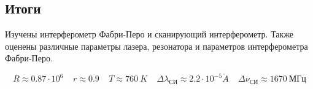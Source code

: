 \documentclass{lab}
\renewcommand{\AA}{\ensuremath{\mathring{A}}}
\begin{document}
\subsection*{Итоги}
Изучены интерферометр Фабри-Перо и сканирующий интерферометр. Также оценены различные параметры лазера, резонатора и параметров интерферометра Фабри-Перо.

\begin{equation}
R \approx 0.87\cdot 10^6 ~~~~~ r \approx 0.9 ~~~~~ T \approx 760~K ~~~~~ \Delta \lambda_{СИ} \approx 2.2\cdot 10^{-5} \AA ~~~~~ \Delta \nu _{СИ} \approx 1670~МГц
\end{equation}
\end{document}
